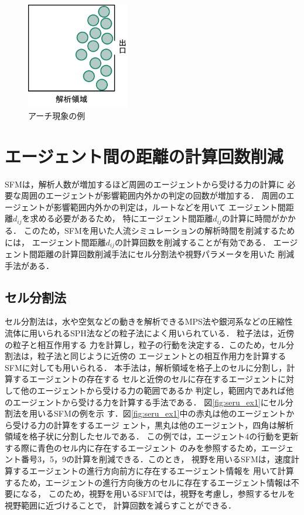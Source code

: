 \begin{figure}[hbtp]
 \begin{center}
  \includegraphics[width=4.5cm,clip]{figure/atigenshou.eps}
  \caption{アーチ現象の例}
  \label{fig:atigenshou}
 \end{center}
\end{figure}

\section{エージェント間の距離の計算回数削減}
SFMは，解析人数が増加するほど周囲のエージェントから受ける力の計算に
必要な周囲のエージェントが影響範囲内外かの判定の回数が増加する．
周囲のエージェントが影響範囲内外かの判定は，ルートなどを用いて
エージェント間距離$d_{ij}$を求める必要があるため，
特にエージェント間距離$d_{ij}$の計算に時間がかかる．
このため，SFMを用いた人流シミュレーションの解析時間を削減するためには，
エージェント間距離$d_{ij}$の計算回数を削減することが有効である．
エージェント間距離の計算回数削減手法にセル分割法や視野パラメータを用いた
削減手法がある．

\subsection{セル分割法}
セル分割法は，水や空気などの動きを解析できるMPS法\cite{mps}や銀河系などの圧縮性
流体に用いられるSPH法\cite{sph}などの粒子法によく用いられている．
粒子法は，近傍の粒子と相互作用する
力を計算し，粒子の行動を決定する．このため，セル分割法は，粒子法と同じように近傍の
エージェントとの相互作用力を計算するSFMに対しても用いられる．
本手法は，解析領域を格子上のセルに分割し，計算するエージェントの存在する
セルと近傍のセルに存在するエージェントに対して他のエージェントから受ける力の範囲であるか
判定し，範囲内であれば他のエージェントから受ける力を計算する手法である．
図\ref{fig:seru_ex1}にセル分割法を用いるSFMの例を示
す．図\ref{fig:seru_ex1}中の赤丸は他のエージェントから受ける力の計算をするエージ
ェント，黒丸は他のエージェント，四角は解析領域を格子状に分割したセルである．
この例では，エージェント4の行動を更新する際に青色のセル内に存在するエージェント
のみを参照するため，エージェント番号3，5，9の計算を削減できる．このとき，
視野を用いるSFMは，速度計算するエージェントの進行方向前方に存在するエージェント情報を
用いて計算するため，エージェントの進行方向後方のセルに存在するエージェント情報は不要になる，
このため，視野を用いるSFMでは，視野を考慮し，参照するセルを視野範囲に近づけることで，
計算回数を減らすことができる．

